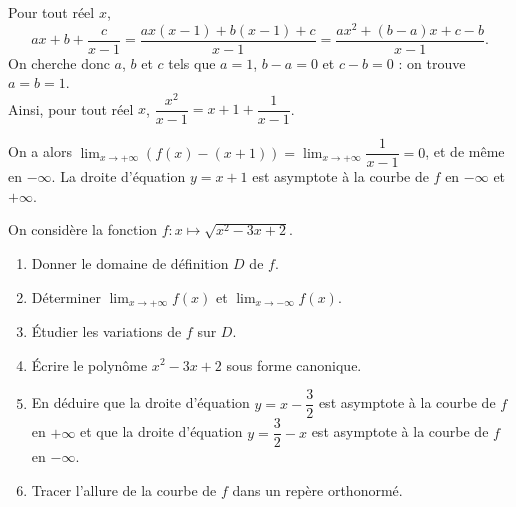 \documentclass[11pt,fleqn, openany]{book} %
\begin{document}
\begin{solution}Pour tout réel $x$, 
\[ax+b+\dfrac{c}{x-1}=\dfrac{ax(x-1)+b(x-1)+c}{x-1}=\dfrac{ax^2+(b-a)x+c-b}{x-1}.\]
On cherche donc $a$, $b$ et $c$ tels que $a=1$, $b-a=0$ et $c-b=0$ : on trouve $a=b=1$.\\ Ainsi, pour tout réel $x$, $\dfrac{x^2}{x-1}=x+1+\dfrac{1}{x-1}$.

On a alors $\displaystyle\lim_{x\to +\infty}(f(x)-(x+1))=\displaystyle\lim_{x\to +\infty}\dfrac{1}{x-1}=0$, et de même en $-\infty$. La droite d'équation $y=x+1$ est asymptote à la courbe de $f$ en $-\infty$ et $+\infty$.\end{solution}




\begin{exercise}On considère la fonction $f : x\mapsto \sqrt{x^2-3x+2}$.
\begin{enumerate}
\item Donner le domaine de définition $D$ de $f$.
\item Déterminer $\displaystyle \lim_{x \to +\infty} f(x)$ et $\displaystyle \lim_{x \to -\infty} f(x)$.
\item Étudier les variations de $f$ sur $D$.
\item Écrire le polynôme $x^2-3x+2$ sous forme canonique.
\item En déduire que la droite d'équation $y=x-\dfrac{3}{2}$ est asymptote à la courbe de $f$ en $+\infty$ et que la droite d'équation $y=\dfrac{3}{2}-x$ est asymptote à la courbe de $f$ en $-\infty$.
\item Tracer l'allure de la courbe de $f$ dans un repère orthonormé.
\end{enumerate}\newpage \end{exercise}
\end{document}
